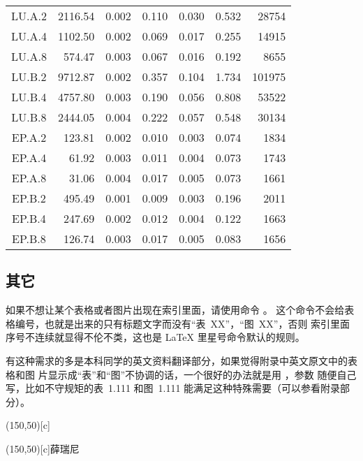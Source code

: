\begin{longtable}[c]{c*{6}{r}}
LU.A.2 & 2116.54 & 0.002 & 0.110 & 0.030 & 0.532 & 28754 \\
LU.A.4 & 1102.50 & 0.002 & 0.069 & 0.017 & 0.255 & 14915 \\
LU.A.8 & 574.47 & 0.003 & 0.067 & 0.016 & 0.192 & 8655 \\
LU.B.2 & 9712.87 & 0.002 & 0.357 & 0.104 & 1.734 & 101975 \\
LU.B.4 & 4757.80 & 0.003 & 0.190 & 0.056 & 0.808 & 53522 \\
LU.B.8 & 2444.05 & 0.004 & 0.222 & 0.057 & 0.548 & 30134 \\
EP.A.2 & 123.81 & 0.002 & 0.010 & 0.003 & 0.074 & 1834 \\
EP.A.4 & 61.92 & 0.003 & 0.011 & 0.004 & 0.073 & 1743 \\
EP.A.8 & 31.06 & 0.004 & 0.017 & 0.005 & 0.073 & 1661 \\
EP.B.2 & 495.49 & 0.001 & 0.009 & 0.003 & 0.196 & 2011 \\
EP.B.4 & 247.69 & 0.002 & 0.012 & 0.004 & 0.122 & 1663 \\
EP.B.8 & 126.74 & 0.003 & 0.017 & 0.005 & 0.083 & 1656 \\
\bottomrule[1.5pt]
\end{longtable}

\subsection{其它}
\label{sec:tableother}
如果不想让某个表格或者图片出现在索引里面，请使用命令 。
这个命令不会给表格编号，也就是出来的只有标题文字而没有“表~XX”，“图~XX”，否则
索引里面序号不连续就显得不伦不类，这也是 \LaTeX{} 里星号命令默认的规则。

有这种需求的多是本科同学的英文资料翻译部分，如果觉得附录中英文原文中的表格和图
片显示成“表”和“图”不协调的话，一个很好的办法就是用 ，参数
随便自己写，比如不守规矩的表~1.111 和图~1.111 能满足这种特殊需要（可以参看附录部
分）。
\begin{table}[ht]
  \begin{minipage}{0.4\linewidth}
    \centering
    \caption*{表~1.111\quad 这是一个手动编号，不出现在索引中的表格。}
    \label{tab:badtabular}
      \framebox(150,50)[c]{\thuthesis}
  \end{minipage}%
  \hfill%
  \begin{minipage}{0.4\linewidth}
    \centering
    \caption*{Figure~1.111\quad 这是一个手动编号，不出现在索引中的图。}
    \label{tab:badfigure}
    \framebox(150,50)[c]{薛瑞尼}
  \end{minipage}
\end{table}

